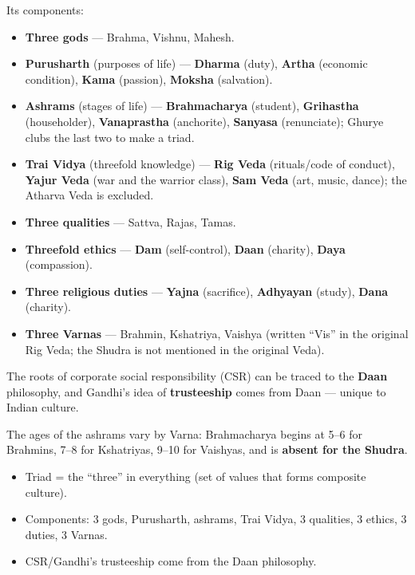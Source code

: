 Its components:
\begin{itemize}
\item \textbf{Three gods} --- Brahma, Vishnu, Mahesh.
\item \textbf{Purusharth} (purposes of life) --- \textbf{Dharma} (duty), \textbf{Artha} (economic condition), \textbf{Kama} (passion), \textbf{Moksha} (salvation).
\item \textbf{Ashrams} (stages of life) --- \textbf{Brahmacharya} (student), \textbf{Grihastha} (householder), \textbf{Vanaprastha} (anchorite), \textbf{Sanyasa} (renunciate); Ghurye clubs the last two to make a triad.
\item \textbf{Trai Vidya} (threefold knowledge) --- \textbf{Rig Veda} (rituals/code of conduct), \textbf{Yajur Veda} (war and the warrior class), \textbf{Sam Veda} (art, music, dance); the Atharva Veda is excluded.
\item \textbf{Three qualities} --- Sattva, Rajas, Tamas.
\item \textbf{Threefold ethics} --- \textbf{Dam} (self-control), \textbf{Daan} (charity), \textbf{Daya} (compassion).
\item \textbf{Three religious duties} --- \textbf{Yajna} (sacrifice), \textbf{Adhyayan} (study), \textbf{Dana} (charity).
\item \textbf{Three Varnas} --- Brahmin, Kshatriya, Vaishya (written ``Vis'' in the original Rig Veda; the Shudra is not mentioned in the original Veda).
\end{itemize}

\begin{ExampleBox}
The roots of corporate social responsibility (CSR) can be traced to the \textbf{Daan} philosophy, and Gandhi's idea of \textbf{trusteeship} comes from Daan --- unique to Indian culture.
\end{ExampleBox}

\begin{DataFact}
The ages of the ashrams vary by Varna: Brahmacharya begins at 5--6 for Brahmins, 7--8 for Kshatriyas, 9--10 for Vaishyas, and is \textbf{absent for the Shudra}.
\end{DataFact}

\begin{QuickRevision}
\begin{itemize}
\item Triad = the ``three'' in everything (set of values that forms composite culture).
\item Components: 3 gods, Purusharth, ashrams, Trai Vidya, 3 qualities, 3 ethics, 3 duties, 3 Varnas.
\item CSR/Gandhi's trusteeship come from the Daan philosophy.
\end{itemize}
\end{QuickRevision}

